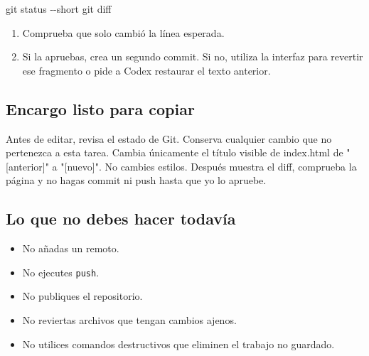 \documentclass[10pt,a4paper,openany]{book}
\providecommand{\tightlist}{\setlength{\itemsep}{0.18em}\setlength{\parskip}{0pt}}
\newenvironment{Shaded}{}{}
\newcommand{\AttributeTok}[1]{\textcolor[rgb]{0.49,0.56,0.16}{#1}}
\newcommand{\FunctionTok}[1]{\textcolor[rgb]{0.02,0.16,0.49}{#1}}
\newcommand{\NormalTok}[1]{#1}
\renewenvironment{Shaded}
  {\begin{tcolorbox}[
    enhanced,
    breakable,
    colback=CodeBg,
    colframe=Border,
    boxrule=0.5pt,
    arc=2mm,
    left=3mm,
    right=3mm,
    top=2.2mm,
    bottom=2.2mm,
    before skip=0.8em,
    after skip=0.9em
  ]}
  {\end{tcolorbox}}
\begin{document}
\begin{Shaded}
\begin{Highlighting}[]
\FunctionTok{git}\NormalTok{ status }\AttributeTok{{-}{-}short}
\FunctionTok{git}\NormalTok{ diff}
\end{Highlighting}
\end{Shaded}

\begin{enumerate}
\def\labelenumi{\arabic{enumi}.}
\setcounter{enumi}{3}
\tightlist
\item
  Comprueba que solo cambió la línea esperada.
\item
  Si la apruebas, crea un segundo commit. Si no, utiliza la interfaz
  para revertir ese fragmento o pide a Codex restaurar el texto
  anterior.
\end{enumerate}

\subsection{Encargo listo para
copiar}\label{encargo-listo-para-copiar-3}

\begin{Shaded}
\begin{Highlighting}[]
\NormalTok{Antes de editar, revisa el estado de Git. Conserva cualquier cambio que no}
\NormalTok{pertenezca a esta tarea. Cambia únicamente el título visible de index.html de}
\NormalTok{"[anterior]" a "[nuevo]". No cambies estilos. Después muestra el diff, comprueba}
\NormalTok{la página y no hagas commit ni push hasta que yo lo apruebe.}
\end{Highlighting}
\end{Shaded}

\subsection{Lo que no debes hacer
todavía}\label{lo-que-no-debes-hacer-todavuxeda}

\begin{itemize}
\tightlist
\item
  No añadas un remoto.
\item
  No ejecutes \texttt{push}.
\item
  No publiques el repositorio.
\item
  No reviertas archivos que tengan cambios ajenos.
\item
  No utilices comandos destructivos que eliminen el trabajo no guardado.
\end{itemize}
\end{document}
